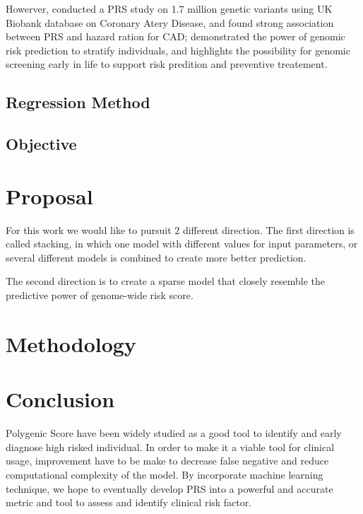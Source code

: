 \documentclass{article}
\begin{document}
Howerver, \cite{Inouye1883} conducted a PRS study on 1.7 million genetic
variants using UK Biobank database on Coronary Atery Disease, and found
strong association between PRS and hazard ration for CAD; demonstrated
the power of genomic risk prediction to stratify individuals, and highlights the
possibility for genomic screening early in life to support risk predition and
preventive treatement.

\subsection{Regression Method}


\subsection{Objective}

\section{Proposal}

For this work we would like to pursuit 2 different direction. The first direction is 
called stacking, in which one model with different values for input parameters, 
or several different models is combined to create more better prediction.

The second direction is to create a sparse model that closely resemble the predictive
power of genome-wide risk score.

\section{Methodology}



\section{Conclusion}

Polygenic Score have been widely studied as a good tool to identify and early
diagnose high risked individual. In order to make it a viable tool for clinical usage,
improvement have to be make to decrease false negative and reduce computational
complexity of the model. By incorporate machine learning technique, we hope to
eventually develop PRS into a powerful and accurate metric and tool to assess
and identify clinical risk factor.

% 

\end{document}
